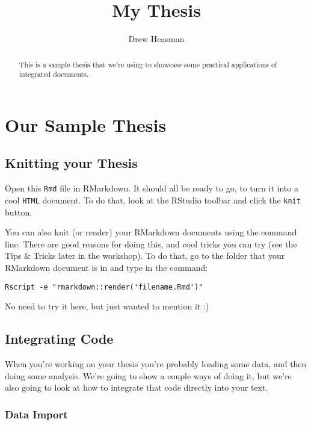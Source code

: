 \documentclass[
]{article}
\title{My Thesis}
\author{Drew Heasman}
\date{}
\begin{document}
\maketitle
\begin{abstract}
This is a sample thesis that we're using to showcase some practical
applications of integrated documents.
\end{abstract}

\hypertarget{our-sample-thesis}{%
\section{Our Sample Thesis}\label{our-sample-thesis}}

\hypertarget{knitting-your-thesis}{%
\subsection{Knitting your Thesis}\label{knitting-your-thesis}}

Open this \texttt{Rmd} file in RMarkdown. It should all be ready to go,
to turn it into a cool \texttt{HTML} document. To do that, look at the
RStudio toolbar and click the \texttt{knit} button.

You can also knit (or render) your RMarkdown documents using the command
line. There are good reasons for doing this, and cool tricks you can try
(see the Tips \& Tricks later in the workshop). To do that, go to the
folder that your RMarkdown document is in and type in the command:

\begin{verbatim}
Rscript -e "rmarkdown::render('filename.Rmd')"
\end{verbatim}

No need to try it here, but just wanted to mention it :)

\hypertarget{integrating-code}{%
\subsection{Integrating Code}\label{integrating-code}}

When you're working on your thesis you're probably loading some data,
and then doing some analysis. We're going to show a couple ways of doing
it, but we're also going to look at how to integrate that code directly
into your text.

\hypertarget{data-import}{%
\subsubsection{Data Import}\label{data-import}}
\end{document}

